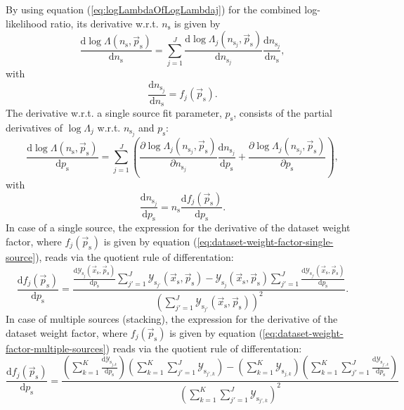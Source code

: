 \documentclass{article}
\newcommand{\ns}{n_{\mathrm{s}}}
\newcommand{\nsj}{n_{\mathrm{s}_j}}
\newcommand{\ps}{\vec{p}_{\mathrm{s}}}
\newcommand{\xs}{\vec{x}_{\mathrm{s}}}
\begin{document}
By using equation (\ref{eq:logLambdaOfLogLambdaj}) for the combined log-likelihood
ratio, its derivative w.r.t. $\ns$ is given by
\begin{equation}
 \frac{\mathrm{d} \log \Lambda(\ns,\ps)}{\mathrm{d} \ns} = \sum_{j=1}^{J} \frac{\mathrm{d} \log \Lambda_j(n_{\mathrm{s}_j},\ps)}{\mathrm{d} n_{\mathrm{s}_j}} \frac{\mathrm{d} n_{\mathrm{s}_j}}{\mathrm{d} \ns},
\end{equation}
with
\begin{equation}
\frac{\mathrm{d} n_{\mathrm{s}_j}}{\mathrm{d} \ns} = f_j(\ps).
\end{equation}
The derivative w.r.t. a single source fit parameter, $p_{\mathrm{s}}$, consists
of the partial derivatives of $\log \Lambda_j$ w.r.t. $n_{\mathrm{s}_j}$ and
$p_{\mathrm{s}}$:
\begin{equation}
 \frac{\mathrm{d} \log \Lambda(\ns,\ps)}{\mathrm{d} p_{\mathrm{s}}} = \sum_{j=1}^{J} \left( \frac{\partial \log \Lambda_j(\nsj,\ps)}{\partial \nsj} \frac{\mathrm{d} \nsj}{\mathrm{d} p_{\mathrm{s}}} + \frac{\partial \log \Lambda_j(\nsj,\ps)}{\partial p_{\mathrm{s}}} \right),
\end{equation}
with
\begin{equation}
 \frac{\mathrm{d} \nsj}{\mathrm{d} p_{\mathrm{s}}} = \ns \frac{\mathrm{d} f_j(\ps)}{\mathrm{d} p_{\mathrm{s}}}.
\end{equation}
In case of a single source, the expression for the derivative of the dataset
weight factor, where $f_j(\ps)$ is given by equation (\ref{eq:dataset-weight-factor-single-source}),
reads via the quotient rule of differentation:
\begin{equation}
\frac{\mathrm{d}f_j(\ps)}{\mathrm{d}p_{\mathrm{s}}} = \frac{\frac{\mathrm{d}\mathcal{Y}_{\mathrm{s}_j}(\xs,\ps)}{\mathrm{d}p_{\mathrm{s}}} \sum_{j'=1}^{J}\mathcal{Y}_{\mathrm{s}_{j'}}(\xs,\ps) - \mathcal{Y}_{\mathrm{s}_j}(\xs,\ps) \sum_{j'=1}^{J} \frac{\mathrm{d}\mathcal{Y}_{\mathrm{s}_{j'}}(\xs,\ps)}{\mathrm{d}p_{\mathrm{s}}} }{\left( \sum_{j'=1}^{J} \mathcal{Y}_{\mathrm{s}_{j'}}(\xs,\ps) \right)^2}.
\end{equation}
In case of multiple sources (stacking), the expression for the derivative of the
dataset weight factor, where $f_j(\ps)$ is given by equation
(\ref{eq:dataset-weight-factor-multiple-sources}) reads via the quotient rule of
differentation:
\begin{equation}
 \frac{\mathrm{d} f_j(\ps)}{\mathrm{d}p_{\mathrm{s}}} =
    \frac{\left(\sum_{k=1}^{K} \frac{\mathrm{d}\mathcal{Y}_{\mathrm{s}_{j,k}}}{\mathrm{d}p_{\mathrm{s}}}\right) \left(\sum_{k=1}^{K}\sum_{j'=1}^{J}\mathcal{Y}_{\mathrm{s}_{j',k}}\right) - \left(\sum_{k=1}^{K}\mathcal{Y}_{\mathrm{s}_{j,k}}\right)\left(\sum_{k=1}^{K}\sum_{j'=1}^{J}\frac{\mathrm{d}\mathcal{Y}_{\mathrm{s}_{j',k}}}{\mathrm{d}p_{\mathrm{s}}}\right)}
         {\left(\sum_{k=1}^{K}\sum_{j'=1}^{J}\mathcal{Y}_{\mathrm{s}_{j',k}} \right)^2}
\end{equation}
\end{document}
